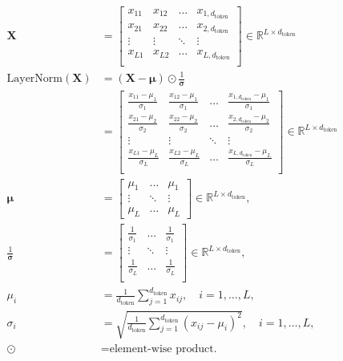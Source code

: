 	\begin{align}
		\label{equ:layer-normalization-start}
		\mathbf{X} &= \begin{bmatrix}
			x_{11} & x_{12} & \dots & x_{1,d_{\text{token}}} \\
		x_{21} & x_{22} & \dots & x_{2,d_{\text{token}}} \\
		\vdots & \vdots & \ddots & \vdots \\
		x_{L1} & x_{L2} & \dots & x_{L,d_{\text{token}}} \\
		\end{bmatrix} \in \mathbb{R}^{L \times d_{\text{token}}} \\
		\text{LayerNorm}(\mathbf{X}) &= (\mathbf{X}-\bm{\mu})\odot \frac{1}{\bm{\sigma}}\\
		&= \begin{bmatrix}
		\frac{x_{11}-\mu_1}{\sigma_1} & \frac{x_{12}-\mu_1}{\sigma_1} & \dots & \frac{x_{1,d_{\text{token}}}-\mu_1}{\sigma_1} \\
		\frac{x_{21}-\mu_2}{\sigma_2} & \frac{x_{22}-\mu_2}{\sigma_2} & \dots & \frac{x_{2,d_{\text{token}}}-\mu_2}{\sigma_2} \\
		\vdots & \vdots & \ddots & \vdots \\
		\frac{x_{L1}-\mu_L}{\sigma_L} & \frac{x_{L2}-\mu_L}{\sigma_L} & \dots & \frac{x_{L,d_{\text{token}}}-\mu_L}{\sigma_L} \\
		\end{bmatrix} \in \mathbb{R}^{L \times d_{\text{token}}} \\
		\bm{\mu} &= \begin{bmatrix}
		\mu_1 &\dots & \mu_1 \\
		\vdots & \ddots &\vdots \\
		\mu_L & \dots & \mu_L
		\end{bmatrix} \in \mathbb{R}^{L\times d_{\text{token}}}, \\
		\frac{1}{\bm{\sigma}} &= \begin{bmatrix}
		\frac{1}{\sigma_1} &\dots & \frac{1}{\sigma_1} \\
		\vdots & \ddots &\vdots \\
		\frac{1}{\sigma_L} &\dots & \frac{1}{\sigma_L} \\
		\end{bmatrix} \in \mathbb{R}^{L\times d_{\text{token}}}, \\
		\mu_i &= \frac{1}{d_\text{token}}\sum_{j=1}^{d_{\text{token}}} x_{ij},\quad i=1,\dots,L, \\
		\sigma_i &= \sqrt{\frac{1}{d_{\text{token}}} \sum_{j=1}^{d_{\text{token}}} (x_{ij}-\mu_i)^2}, \quad i = 1,\dots, L, \\
		\label{equ:layer-normalization-end}
		\odot &= \text{element-wise product.} 
		\end{align}


